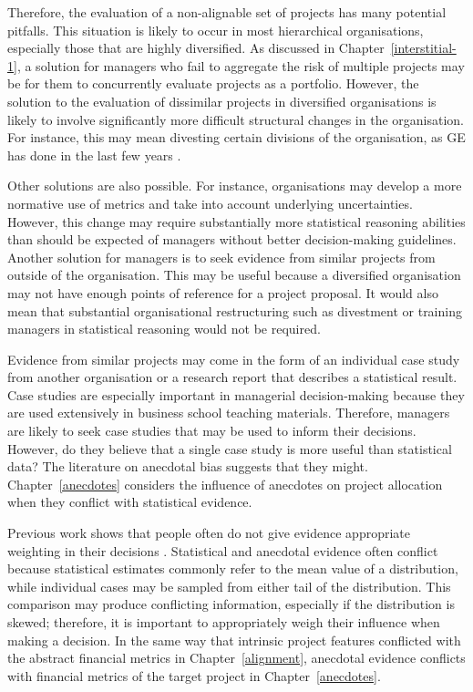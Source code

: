\documentclass[a4paper, nobind]{templates/ociamthesis}
\theoremstyle{definition}
\theoremstyle{definition}
\theoremstyle{definition}
\theoremstyle{definition}
\theoremstyle{remark}
\begin{document}
Therefore, the evaluation of a non-alignable set of projects has many potential
pitfalls. This situation is likely to occur in most hierarchical organisations,
especially those that are highly diversified. As discussed in
Chapter~\ref{interstitial-1}, a solution for managers who fail to aggregate the
risk of multiple projects may be for them to concurrently evaluate projects as a
portfolio. However, the solution to the evaluation of dissimilar projects in
diversified organisations is likely to involve significantly more difficult
structural changes in the organisation. For instance, this may mean divesting
certain divisions of the organisation, as GE has done in the last few years
\autocite{scott2018}.

Other solutions are also possible. For instance, organisations may develop a
more normative use of metrics and take into account underlying uncertainties.
However, this change may require substantially more statistical reasoning
abilities than should be expected of managers without better decision-making
guidelines. Another solution for managers is to seek evidence from similar
projects from outside of the organisation. This may be useful because a
diversified organisation may not have enough points of reference for a project
proposal. It would also mean that substantial organisational restructuring such
as divestment or training managers in statistical reasoning would not be
required.

Evidence from similar projects may come in the form of an individual case study
from another organisation or a research report that describes a statistical
result. Case studies are especially important in managerial decision-making
because they are used extensively in business school teaching materials.
Therefore, managers are likely to seek case studies that may be used to inform
their decisions. However, do they believe that a single case study is more
useful than statistical data? The literature on anecdotal bias suggests that
they might. Chapter~\ref{anecdotes} considers the influence of anecdotes on
project allocation when they conflict with statistical evidence.

Previous work shows that people often do not give evidence appropriate weighting
in their decisions \autocite{griffin1992}. Statistical and anecdotal evidence often
conflict because statistical estimates commonly refer to the mean value of a
distribution, while individual cases may be sampled from either tail of the
distribution. This comparison may produce conflicting information, especially if
the distribution is skewed; therefore, it is important to appropriately weigh
their influence when making a decision. In the same way that intrinsic project
features conflicted with the abstract financial metrics in
Chapter~\ref{alignment}, anecdotal evidence conflicts with financial metrics of
the target project in Chapter~\ref{anecdotes}.
\end{document}

